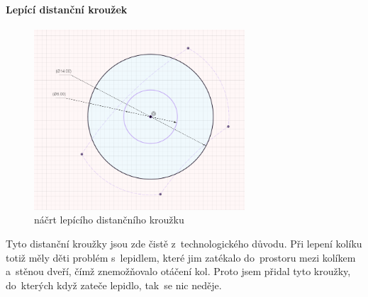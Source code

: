 \paragraph{Lepící distanční kroužek}

\begin{figure}[h]
	\centering
    \includegraphics[width=0.7\textwidth]{kapitoly/obrazky/M3/lepici_distance.png}
    \caption{náčrt lepícího distančního kroužku}
    \label{fig:M3-lepici-distance}
\end{figure}

Tyto distanční kroužky jsou zde čistě z~technologického důvodu. Při lepení kolíku totiž měly děti problém s~lepidlem, které jim zatékalo do~prostoru mezi kolíkem 
a~stěnou dveří, čímž znemožňovalo otáčení kol. Proto jsem přidal tyto kroužky, do~kterých když zateče lepidlo, tak~se nic neděje.

\newpage